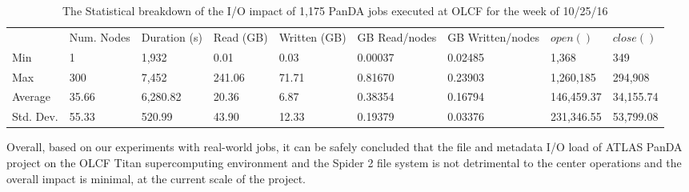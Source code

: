 \begin{table}[t]
\centering
\begin{tabular}{lllllllll}
 & Num. Nodes & Duration (s) & Read (GB) & Written (GB) & GB Read/nodes & GB Written/nodes & $open()$ & $close()$ \\
Min & 1 & 1,932 & 0.01 & 0.03 & 0.00037 & 0.02485 & 1,368 & 349 \\
Max & 300 & 7,452 & 241.06 & 71.71 & 0.81670 & 0.23903 & 1,260,185 & 294,908 \\
Average & 35.66 & 6,280.82 & 20.36 & 6.87 & 0.38354 & 0.16794 & 146,459.37 & 34,155.74 \\
Std. Dev. & 55.33 & 520.99 & 43.90 & 12.33 & 0.19379 & 0.03376 & 231,346.55 & 53,799.08
\end{tabular}
\caption{The Statistical breakdown of the I/O impact of 1,175 PanDA jobs executed at OLCF for the week of 10/25/16}
\label{panda-olcf-stats}
\end{table}

Overall, based on our experiments with real-world jobs, it can be safely
concluded that the file and metadata I/O load of ATLAS PanDA project on the OLCF
Titan supercomputing environment and the Spider 2 file system is not detrimental
to the center operations and the overall impact is minimal, at the current scale
of the project.
